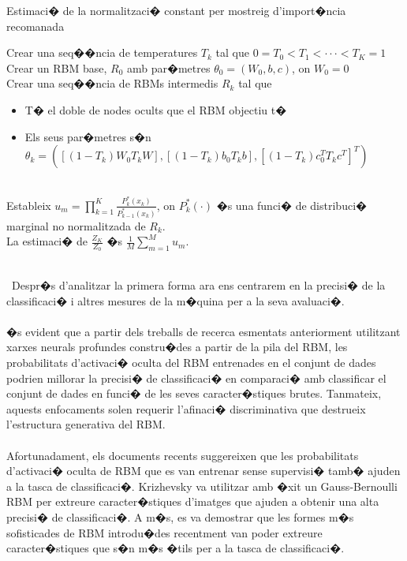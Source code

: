 \documentclass[12pt,a4paper,openright,oneside]{article}
\numberwithin{equation}{section}
\theoremstyle{definition}
\begin{document}
\begin{algorithm}
\caption{ Estimaci� de la normalitzaci� constant per mostreig d'import�ncia recomanada}
\begin{algorithmic} 
\STATE Crear una seq��ncia de temperatures ${T_k}$ tal que ${0 = T_0 < T_1 < \cdot \cdot \cdot < T_K = 1}$\\
Crear un RBM base, ${R_0}$ amb par�metres ${\theta_0 = (W_0,b,c)}$, on ${W_0 = 0}$ \\
Crear una seq��ncia de RBMs intermedis ${R_k}$ tal que
\begin{itemize}
\item T� el doble de nodes ocults que el RBM objectiu t�
\item Els seus par�metres s�n ${\theta_k = ([(1-T_k)W_0 T_k W],[(1-T_{k}) b_0 T_k b],[(1-T_k)c_{0}^{T} T_kc^T]^T)}$
\end{itemize}
\ENDFOR \\
Estableix ${u_m = \prod_{k = 1}^K \frac{P_k^\ast (x_k)}{P_{k-1}^\ast (x_k)}}$, on ${P_k^\ast (\cdot)}$ �s una funci� de distribuci� marginal no normalitzada de ${R_k}$.
\ENDFOR \\
La estimaci� de ${\frac{Z_K}{Z_0}}$ �s ${\frac{1}{M} \sum_{m=1}^M u_m}$.
\end{algorithmic}
\end{algorithm}
\\\
Despr�s d'analitzar la primera forma ara ens centrarem en la precisi� de la classificaci� i altres mesures de la m�quina per a la seva avaluaci�.\\\\
�s evident que a partir dels treballs de recerca esmentats anteriorment utilitzant xarxes neurals profundes constru�des a partir de la pila del RBM, les probabilitats d'activaci� oculta del RBM entrenades en el conjunt de dades podrien millorar la precisi� de classificaci� en comparaci� amb classificar el conjunt de dades en funci� de les seves caracter�stiques brutes. Tanmateix, aquests enfocaments solen requerir l'afinaci� discriminativa que destrueix l'estructura generativa del RBM.\\\\
Afortunadament, els documents recents suggereixen que les probabilitats d'activaci� oculta de RBM que es van entrenar sense supervisi� tamb� ajuden a la tasca de classificaci�. Krizhevsky va utilitzar amb �xit un Gauss-Bernoulli RBM per extreure caracter�stiques d'imatges que ajuden a obtenir una alta precisi� de classificaci�. A m�s, es va demostrar que les formes m�s sofisticades de RBM introdu�des recentment \cite{ranzato} van poder extreure caracter�stiques que s�n m�s �tils per a la tasca de classificaci�.\\\\
\end{document}
